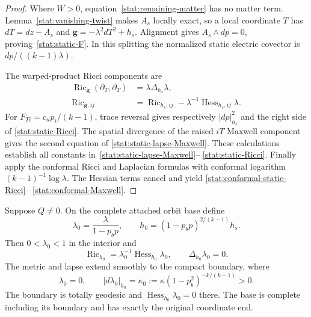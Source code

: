 \begin{proof}
Where $W>0$, equation~\eqref{stat:remaining-matter} has no matter
term.  Lemma~\ref{stat:vanishing-twist} makes $A_s$ locally exact,
so a local coordinate $T$ has $dT=dz-A_s$ and
$\mathbf g=-\lambda^2dT^2+h_s$.  Alignment gives
$A_s\wedge dp=0$, proving~\eqref{stat:static-F}.
In this splitting the normalized static electric covector is
$dp/((k-1)\lambda)$.

The warped-product Ricci components are
\[
\begin{split}
 \operatorname{Ric}_{\mathbf g}(\partial_T,\partial_T)
 &=\lambda\Delta_{h_s}\lambda,\\
 \operatorname{Ric}_{\mathbf g,ij}
 &=\operatorname{Ric}_{h_s,ij}
 -\lambda^{-1}\operatorname{Hess}_{h_s,ij}\lambda.
\end{split}
\]
For $F_{Ti}=c_n p_i/(k-1)$, trace reversal gives respectively
$|dp|_{h_s}^2$ and the right side of
\eqref{stat:static-Ricci}.  The spatial divergence of the raised
$iT$ Maxwell component gives the second equation of
\eqref{stat:static-lapse-Maxwell}.  These calculations establish
all constants in~\eqref{stat:static-lapse-Maxwell}--
\eqref{stat:static-Ricci}.  Finally apply the conformal Ricci and
Laplacian formulas with conformal logarithm
$(k-1)^{-1}\log\lambda$.  The Hessian terms cancel and yield
\eqref{stat:conformal-static-Ricci}--
\eqref{stat:conformal-Maxwell}.
\end{proof}

\begin{proposition}
\label{stat:charged-vacuum}
Suppose $Q\ne0$.  On the complete attached orbit base define
\begin{equation}
 \lambda_0=\frac{\lambda}{1-p_bp},\qquad
 h_0=(1-p_bp)^{2/(k-1)}h_s.
 \label{stat:explicit-vacuum-transform}
\end{equation}
Then $0<\lambda_0<1$ in the interior and
\begin{equation}
 \operatorname{Ric}_{h_0}
      =\lambda_0^{-1}\operatorname{Hess}_{h_0}\lambda_0,
 \qquad \Delta_{h_0}\lambda_0=0.
 \label{stat:vacuum-equations}
\end{equation}
The metric and lapse extend smoothly to the compact boundary, where
\begin{equation}
 \lambda_0=0,\qquad
 |d\lambda_0|_{h_0}
   =\kappa_0:=\kappa(1-p_b^2)^{-k/(k-1)}>0.
 \label{stat:vacuum-boundary-gradient}
\end{equation}
The boundary is totally geodesic and
$\operatorname{Hess}_{h_0}\lambda_0=0$ there.  The base is complete
including its boundary and has exactly the original coordinate end.
\end{proposition}

